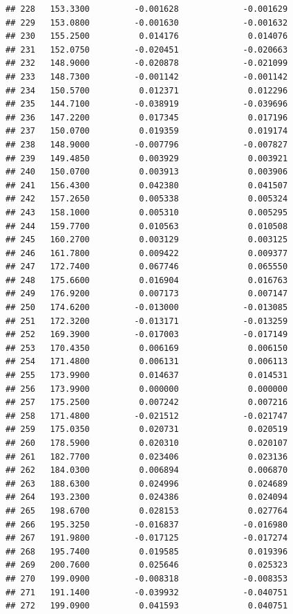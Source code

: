\documentclass[
]{article}
\begin{document}
\begin{verbatim}
## 228   153.3300         -0.001628             -0.001629
## 229   153.0800         -0.001630             -0.001632
## 230   155.2500          0.014176              0.014076
## 231   152.0750         -0.020451             -0.020663
## 232   148.9000         -0.020878             -0.021099
## 233   148.7300         -0.001142             -0.001142
## 234   150.5700          0.012371              0.012296
## 235   144.7100         -0.038919             -0.039696
## 236   147.2200          0.017345              0.017196
## 237   150.0700          0.019359              0.019174
## 238   148.9000         -0.007796             -0.007827
## 239   149.4850          0.003929              0.003921
## 240   150.0700          0.003913              0.003906
## 241   156.4300          0.042380              0.041507
## 242   157.2650          0.005338              0.005324
## 243   158.1000          0.005310              0.005295
## 244   159.7700          0.010563              0.010508
## 245   160.2700          0.003129              0.003125
## 246   161.7800          0.009422              0.009377
## 247   172.7400          0.067746              0.065550
## 248   175.6600          0.016904              0.016763
## 249   176.9200          0.007173              0.007147
## 250   174.6200         -0.013000             -0.013085
## 251   172.3200         -0.013171             -0.013259
## 252   169.3900         -0.017003             -0.017149
## 253   170.4350          0.006169              0.006150
## 254   171.4800          0.006131              0.006113
## 255   173.9900          0.014637              0.014531
## 256   173.9900          0.000000              0.000000
## 257   175.2500          0.007242              0.007216
## 258   171.4800         -0.021512             -0.021747
## 259   175.0350          0.020731              0.020519
## 260   178.5900          0.020310              0.020107
## 261   182.7700          0.023406              0.023136
## 262   184.0300          0.006894              0.006870
## 263   188.6300          0.024996              0.024689
## 264   193.2300          0.024386              0.024094
## 265   198.6700          0.028153              0.027764
## 266   195.3250         -0.016837             -0.016980
## 267   191.9800         -0.017125             -0.017274
## 268   195.7400          0.019585              0.019396
## 269   200.7600          0.025646              0.025323
## 270   199.0900         -0.008318             -0.008353
## 271   191.1400         -0.039932             -0.040751
## 272   199.0900          0.041593              0.040751

\end{verbatim}
\end{document}
